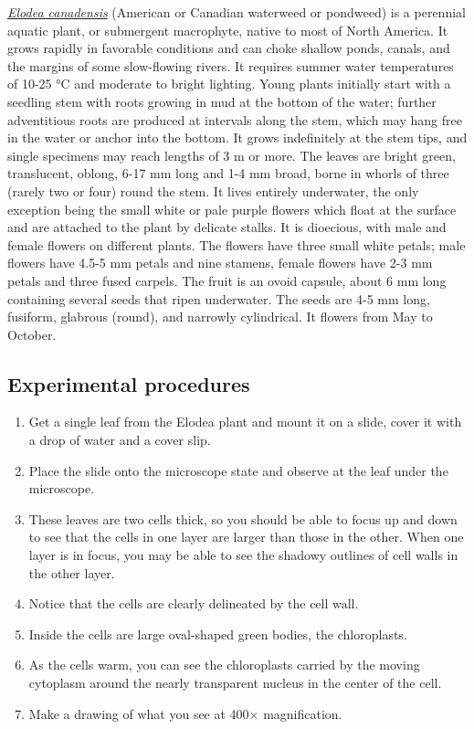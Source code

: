 \href{https://en.wikipedia.org/wiki/Elodea_canadensis}{\emph{Elodea canadensis}} (American or Canadian waterweed or pondweed) is a perennial aquatic plant, or submergent macrophyte, native to most of North America. It grows rapidly in favorable conditions and can choke shallow ponds, canals, and the margins of some slow-flowing rivers. It requires summer water temperatures of 10-25 °C and moderate to bright lighting.
Young plants initially start with a seedling stem with roots growing in mud at the bottom of the water; further adventitious roots are produced at intervals along the stem, which may hang free in the water or anchor into the bottom. It grows indefinitely at the stem tips, and single specimens may reach lengths of 3 m or more.
The leaves are bright green, translucent, oblong, 6-17 mm long and 1-4 mm broad, borne in whorls of three (rarely two or four) round the stem. It lives entirely underwater, the only exception being the small white or pale purple flowers which float at the surface and are attached to the plant by delicate stalks.
It is dioecious, with male and female flowers on different plants. The flowers have three small white petals; male flowers have 4.5-5 mm petals and nine stamens, female flowers have 2-3 mm petals and three fused carpels. The fruit is an ovoid capsule, about 6 mm long containing several seeds that ripen underwater. The seeds are 4-5 mm long, fusiform, glabrous (round), and narrowly cylindrical. It flowers from May to October.

\hypertarget{experimental-procedures}{%
\subsection{Experimental procedures}\label{experimental-procedures}}

\begin{enumerate}
\def\labelenumi{\arabic{enumi}.}
\tightlist
\item
  Get a single leaf from the Elodea plant and mount it on a slide, cover it with a drop of water and a cover slip.
\item
  Place the slide onto the microscope state and observe at the leaf under the microscope.
\item
  These leaves are two cells thick, so you should be able to focus up and down to see that the cells in one layer are larger than those in the other. When one layer is in focus, you may be able to see the shadowy outlines of cell walls in the other layer.
\item
  Notice that the cells are clearly delineated by the cell wall.
\item
  Inside the cells are large oval-shaped green bodies, the chloroplasts.
\item
  As the cells warm, you can see the chloroplasts carried by the moving cytoplasm around the nearly transparent nucleus in the center of the cell.
\item
  Make a drawing of what you see at 400× magnification.
\end{enumerate}

